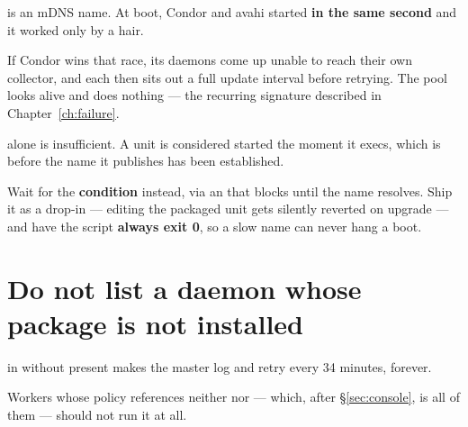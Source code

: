  is an mDNS name. At boot, Condor and avahi started \textbf{in
the same second} and it worked only by a hair.

If Condor wins that race, its daemons come up unable to reach their own
collector, and each then sits out a full update interval before retrying. The
pool looks alive and does nothing --- the recurring signature described in
Chapter~\ref{ch:failure}.

\begin{trap}
 alone is insufficient. A  unit is considered started
the moment it execs, which is before the name it publishes has been established.
\end{trap}

Wait for the \textbf{condition} instead, via an  that blocks
until the name resolves. Ship it as a  drop-in ---
editing the packaged unit gets silently reverted on upgrade --- and have the
script \textbf{always exit 0}, so a slow name can never hang a boot.

\section{Do not list a daemon whose package is not installed}

 in  without  present makes the master
log  and retry every 34 minutes, forever.

Workers whose policy references neither  nor 
--- which, after \S\ref{sec:console}, is all of them --- should not run it at all.
